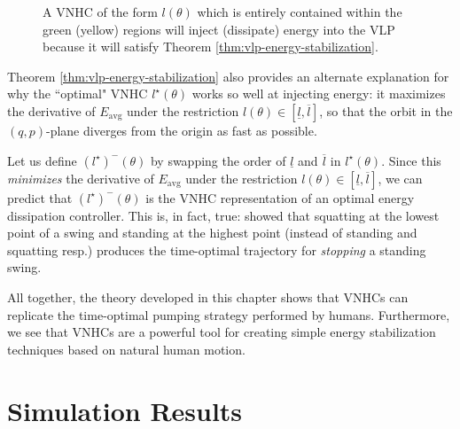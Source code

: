\begin{figure}
   \centering
   
   \caption{A VNHC of the form \(l(\theta)\) which is entirely contained within
      the green (yellow) regions will inject (dissipate) energy into the VLP
      because it will satisfy Theorem \ref{thm:vlp-energy-stabilization}.}
      \label{fig:vlp-energy-in-out}
\end{figure}

Theorem \ref{thm:vlp-energy-stabilization} also provides an alternate
explanation for why the ``optimal" VNHC \(l^\star(\theta)\) works so well at
injecting energy: it maximizes the derivative of \(E_\text{avg}\) under the
restriction \(l(\theta) \in [\underline{l},\overline{l}]\), so that the orbit in the
\((q,p)\)-plane diverges from the origin as fast as possible. 

Let us define \((l^\star)^{-}(\theta)\) by swapping the order of 
\(\underline{l}\) and \(\overline{l}\) in \(l^\star(\theta)\). Since this 
\textit{minimizes} the derivative of \(E_\text{avg}\) under the restriction
\(l(\theta) \in [\underline{l},\overline{l}]\), we can predict that 
\((l^\star)^{-}(\theta)\) is the VNHC representation of an optimal 
energy dissipation controller.
This is, in fact, true: \cite{pumping_swing_standing_squatting} showed 
that squatting at the lowest point of a swing and standing at the highest
point (instead of standing and squatting resp.) produces the
time-optimal trajectory for \textit{stopping} a standing swing. 

All together, the theory developed in this chapter shows that VNHCs can
replicate the time-optimal pumping strategy performed by humans. 
Furthermore, we see that VNHCs are a powerful tool for creating simple energy
stabilization techniques based on natural human motion.

\section{Simulation Results}

